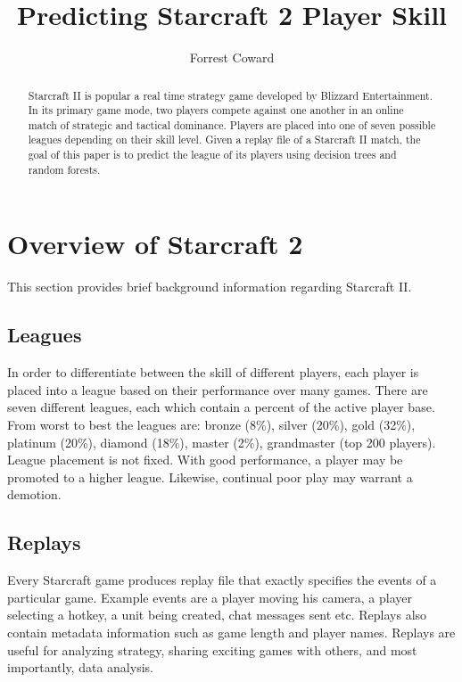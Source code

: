 \documentclass{article} %
\title{Predicting Starcraft 2 Player Skill}
\author{Forrest Coward}
\begin{document}
\maketitle

\begin{abstract}
Starcraft II is popular a real time strategy game developed by Blizzard Entertainment. In its primary game mode, two players compete against one another in an online match of strategic and tactical dominance. Players are placed into one of seven possible leagues depending on their skill level. Given a replay file of a Starcraft II match, the goal of this paper is to predict the  league of its players using decision trees and random forests. 
\end{abstract}

\section{Overview of Starcraft 2}

This section provides brief background information regarding Starcraft II. 
\subsection{Leagues}

In order to differentiate between the skill of different players, each player is placed into a league based on their performance over many games. There are seven different leagues, each which contain a percent of the active player base. From worst to best the leagues are: bronze (8\%), silver (20\%), gold (32\%), platinum (20\%), diamond (18\%), master (2\%), grandmaster (top 200 players). League placement is not fixed. With good performance, a player may be promoted to a higher league. Likewise, continual poor play may warrant a demotion. 

\subsection{Replays}

Every Starcraft  game produces replay file that exactly specifies the events of a particular game. Example events are a player moving his camera, a player selecting a hotkey, a unit being created, chat messages sent etc. Replays also contain metadata information such as game length and player names. Replays are useful for analyzing strategy, sharing exciting games with others, and most importantly, data analysis. 
\end{document}
